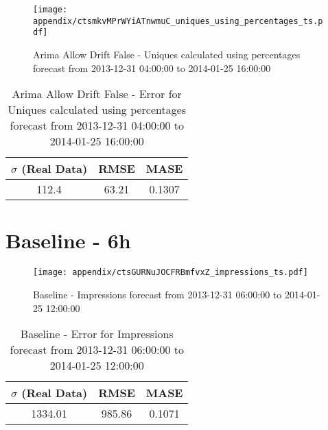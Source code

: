 \begin{figure}[H] \begin{center} \leavevmode
\texttt{[image: appendix/ctsmkvMPrWYiATnwmuC\_uniques\_using\_percentages\_ts.pdf]} \caption[]{
Arima Allow Drift False - Uniques calculated using percentages forecast from 2013-12-31 04:00:00 to 2014-01-25 16:00:00} \label{fig:appendix/ctsmkvMPrWYiATnwmuC_uniques_using_percentages_ts.pdf} \end{center}
\end{figure}

\begin{table}[H]
\centering
\footnotesize
\begin{tabular}{ccc}
$\sigma$ (Real Data) & RMSE & MASE   \\ \hline
112.4 & 63.21 & 0.1307 \\
\end{tabular}

\vspace{0.5cm}

\caption[]{
Arima Allow Drift False - Error for Uniques calculated using percentages forecast from 2013-12-31 04:00:00 to 2014-01-25 16:00:00}
\end{table}

\section{Baseline - 6h}
\begin{figure}[H] \begin{center} \leavevmode
\texttt{[image: appendix/ctsGURNuJOCFRBmfvxZ\_impressions\_ts.pdf]} \caption[]{
Baseline - Impressions forecast from 2013-12-31 06:00:00 to 2014-01-25 12:00:00} \label{fig:appendix/ctsGURNuJOCFRBmfvxZ_impressions_ts.pdf} \end{center}
\end{figure}

\begin{table}[H]
\centering
\footnotesize
\begin{tabular}{ccc}
$\sigma$ (Real Data) & RMSE & MASE   \\ \hline
1334.01 & 985.86 & 0.1071 \\
\end{tabular}

\vspace{0.5cm}

\caption[]{
Baseline - Error for Impressions forecast from 2013-12-31 06:00:00 to 2014-01-25 12:00:00}
\end{table}

